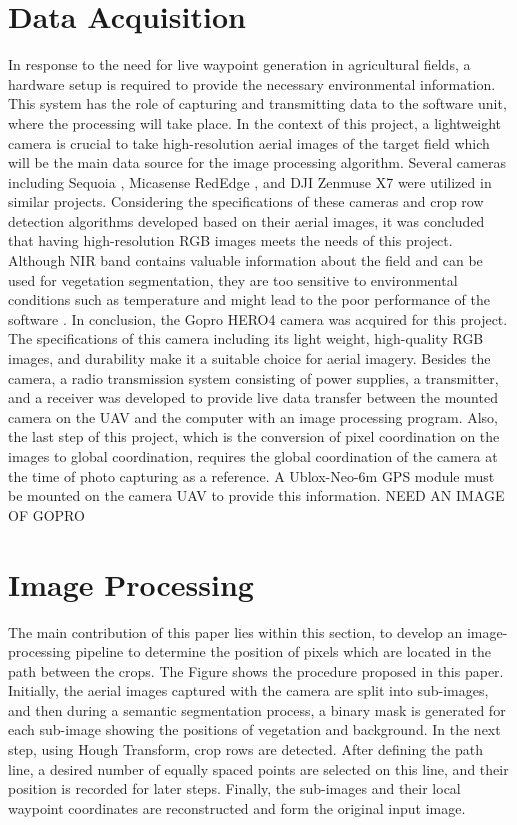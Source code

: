 \documentclass[conference]{IEEEtran}
\begin{document}
\section{Data Acquisition}\label{Data Acquisition}
In response to the need for live waypoint generation in agricultural fields, a hardware setup is required to provide the necessary environmental information. This system has the role of capturing and transmitting data to the software unit, where the processing will take place. In the context of this project, a lightweight camera is crucial to take high-resolution aerial images of the target field which will be the main data source for the image processing algorithm. Several cameras including Sequoia 
\cite{b9,b4,b7,b6}
, Micasense RedEdge
\cite{b9,b14}, and DJI Zenmuse X7
\cite{b5} were utilized in similar projects. Considering the specifications of these cameras and crop row detection algorithms developed based on their aerial images, it was concluded that having high-resolution RGB images meets the needs of this project. Although NIR band contains valuable information about the field and can be used for vegetation segmentation, they are too sensitive to environmental conditions such as temperature and might lead to the poor performance of the software
\cite{b5}. In conclusion, the Gopro HERO4 camera was acquired for this project. The specifications of this camera including its light weight, high-quality RGB images, and durability make it a suitable choice for aerial imagery. 
Besides the camera, a radio transmission system consisting of power supplies, a transmitter, and a receiver was developed to provide live data transfer between the mounted camera on the UAV and the computer with an image processing program. 
Also, the last step of this project, which is the conversion of pixel coordination on the images to global coordination, requires the global coordination of the camera at the time of photo capturing as a reference. A Ublox-Neo-6m GPS module must be mounted on the camera UAV to provide this information.
NEED AN IMAGE OF GOPRO


\section{Image Processing}\label{Image Processing}
The main contribution of this paper lies within this section, to develop an image-processing pipeline to determine the position of pixels which are located in the path between the crops. The Figure shows the procedure proposed in this paper. Initially, the aerial images captured with the camera are split into sub-images, and then during a semantic segmentation process, a binary mask is generated for each sub-image showing the positions of vegetation and background. In the next step, using Hough Transform, crop rows are detected. After defining the path line, a desired number of equally spaced points are selected on this line, and their position is recorded for later steps. Finally, the sub-images and their local waypoint coordinates are reconstructed and form the original input image.
\end{document}

